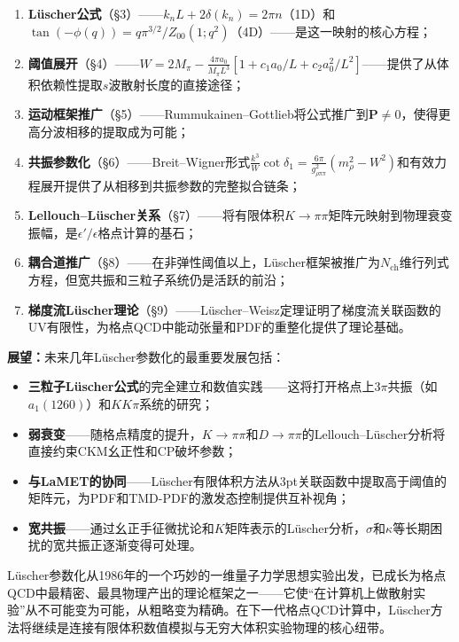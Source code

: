 \documentclass[12pt,a4paper]{ctexart}
\theoremstyle{definition}
\begin{document}
\begin{enumerate}[leftmargin=*]
    \item \textbf{L\"uscher公式}（§3）——$k_n L + 2\delta(k_n) = 2\pi n$（1D）和$\tan(-\phi(q)) = q\pi^{3/2}/Z_{00}(1;q^2)$（4D）——是这一映射的核心方程；
    \item \textbf{阈值展开}（§4）——$W = 2M_\pi - \frac{4\pi a_0}{M_\pi L^3}[1 + c_1 a_0/L + c_2 a_0^2/L^2]$——提供了从体积依赖性提取$s$波散射长度的直接途径；
    \item \textbf{运动框架推广}（§5）——Rummukainen--Gottlieb将公式推广到$\mathbf{P} \neq 0$，使得更高分波相移的提取成为可能；
    \item \textbf{共振参数化}（§6）——Breit--Wigner形式$\frac{k^3}{W}\cot\delta_1 = \frac{6\pi}{g_{\rho\pi\pi}^2}(m_\rho^2 - W^2)$和有效力程展开提供了从相移到共振参数的完整拟合链条；
    \item \textbf{Lellouch--L\"uscher关系}（§7）——将有限体积$K\to\pi\pi$矩阵元映射到物理衰变振幅，是$\epsilon'/\epsilon$格点计算的基石；
    \item \textbf{耦合道推广}（§8）——在非弹性阈值以上，L\"uscher框架被推广为$N_{\text{ch}}$维行列式方程，但宽共振和三粒子系统仍是活跃的前沿；
    \item \textbf{梯度流L\"uscher理论}（§9）——L\"uscher--Weisz定理证明了梯度流关联函数的UV有限性，为格点QCD中能动张量和PDF的重整化提供了理论基础。
\end{enumerate}

\textbf{展望：}未来几年L\"uscher参数化的最重要发展包括：

\begin{itemize}[leftmargin=*]
    \item \textbf{三粒子L\"uscher公式}的完全建立和数值实践——这将打开格点上$3\pi$共振（如$a_1(1260)$）和$KK\pi$系统的研究；
    \item \textbf{弱衰变}——随格点精度的提升，$K\to\pi\pi$和$D\to\pi\pi$的Lellouch--L\"uscher分析将直接约束CKM幺正性和CP破坏参数；
    \item \textbf{与LaMET的协同}——L\"uscher有限体积方法从3pt关联函数中提取高于阈值的矩阵元，为PDF和TMD-PDF的激发态控制提供互补视角；
    \item \textbf{宽共振}——通过幺正手征微扰论和$K$矩阵表示的L\"uscher分析，$\sigma$和$\kappa$等长期困扰的宽共振正逐渐变得可处理。
\end{itemize}

L\"uscher参数化从1986年的一个巧妙的一维量子力学思想实验出发，已成长为格点QCD中最精密、最具物理产出的理论框架之一——它使``在计算机上做散射实验''从不可能变为可能，从粗略变为精确。在下一代格点QCD计算中，L\"uscher方法将继续是连接有限体积数值模拟与无穷大体积实验物理的核心纽带。
\end{document}
